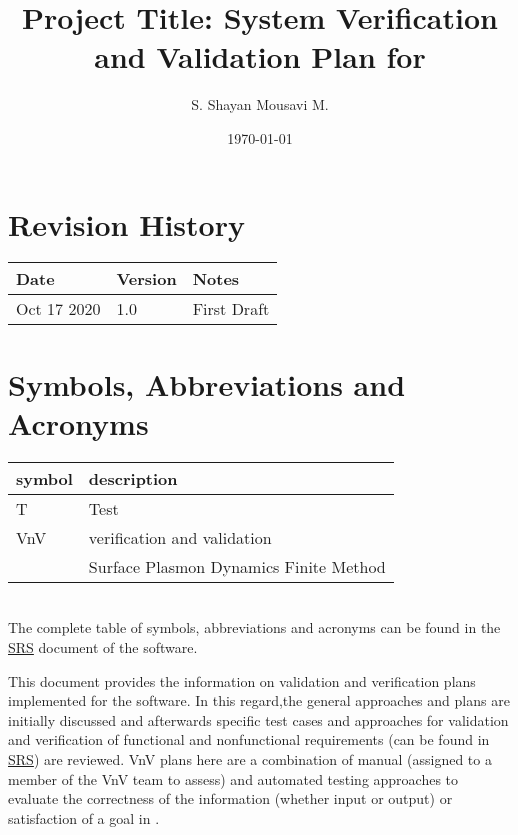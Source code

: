 \documentclass[12pt, titlepage]{article}
\begin{document}
\title{Project Title: System Verification and Validation Plan for \progname{}} 
\author{S. Shayan Mousavi M.}
\date{\today}
	
\maketitle


\section{Revision History}

\begin{tabularx}{\textwidth}{p{3cm}p{2cm}X}
\toprule {\bf Date} & {\bf Version} & {\bf Notes}\\
\midrule
Oct 17 2020& 1.0 & First Draft\\
\bottomrule
\end{tabularx}

\newpage

\tableofcontents

\listoftables

\listoffigures

\newpage

\section{Symbols, Abbreviations and Acronyms}

\renewcommand{\arraystretch}{1.2}
\begin{tabular}{l l} 
  \toprule		
  \textbf{symbol} & \textbf{description}\\
  \midrule 
  T & Test\\
  VnV & verification and validation\\
  \progname{} & Surface Plasmon Dynamics Finite Method\\
  \bottomrule
\end{tabular}\\
The complete table of symbols, abbreviations and acronyms can be found in the \href{https://github.com/shmouses/SPDFM/tree/master/docs/SRS}{SRS} document of the software. 
\newpage


This document provides the information on validation and verification plans implemented for the \progname{} software. In this regard,the general approaches and plans are initially discussed and afterwards specific test cases and approaches for validation and verification of functional and nonfunctional requirements (can be found in \href{https://github.com/shmouses/SPDFM/tree/master/docs/SRS}{SRS}) are reviewed. VnV plans here are a combination of manual (assigned to a member of the VnV team to assess) and automated testing approaches to evaluate the correctness of the information (whether input or output) or satisfaction of a goal in \progname{}.    
\end{document}
